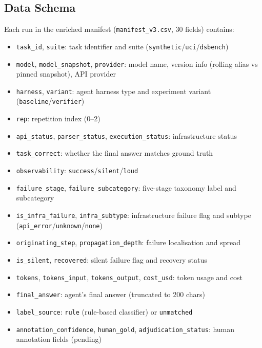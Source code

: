 \subsection{Data Schema}

Each run in the enriched manifest (\texttt{manifest\_v3.csv}, 30 fields) contains:

\begin{itemize}[leftmargin=*,itemsep=1pt]
\item \texttt{task\_id}, \texttt{suite}: task identifier and suite (\texttt{synthetic}/\texttt{uci}/\texttt{dsbench})
\item \texttt{model}, \texttt{model\_snapshot}, \texttt{provider}: model name, version info (rolling alias vs pinned snapshot), API provider
\item \texttt{harness}, \texttt{variant}: agent harness type and experiment variant (\texttt{baseline}/\texttt{verifier})
\item \texttt{rep}: repetition index (0--2)
\item \texttt{api\_status}, \texttt{parser\_status}, \texttt{execution\_status}: infrastructure status
\item \texttt{task\_correct}: whether the final answer matches ground truth
\item \texttt{observability}: \texttt{success}/\texttt{silent}/\texttt{loud}
\item \texttt{failure\_stage}, \texttt{failure\_subcategory}: five-stage taxonomy label and subcategory
\item \texttt{is\_infra\_failure}, \texttt{infra\_subtype}: infrastructure failure flag and subtype (\texttt{api\_error}/\texttt{unknown}/\texttt{none})
\item \texttt{originating\_step}, \texttt{propagation\_depth}: failure localisation and spread
\item \texttt{is\_silent}, \texttt{recovered}: silent failure flag and recovery status
\item \texttt{tokens}, \texttt{tokens\_input}, \texttt{tokens\_output}, \texttt{cost\_usd}: token usage and cost
\item \texttt{final\_answer}: agent's final answer (truncated to 200 chars)
\item \texttt{label\_source}: \texttt{rule} (rule-based classifier) or \texttt{unmatched}
\item \texttt{annotation\_confidence}, \texttt{human\_gold}, \texttt{adjudication\_status}: human annotation fields (pending)
\end{itemize}

